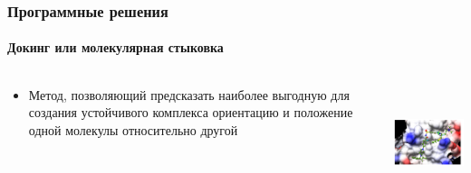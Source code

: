 \begin{frame}
  \frametitle{Программные решения}
  \framesubtitle{Докинг или молекулярная стыковка}
  \begin{columns}
    \begin{column}{0.5\textwidth}
      \begin{itemize}
        \item Метод, позволяющий предсказать наиболее выгодную для создания устойчивого комплекса ориентацию и положение
          одной молекулы относительно другой
      \end{itemize}
    \end{column}
    \begin{column}{0.5\textwidth}
  \includegraphics[height=1.3in]{images/docking.png}
\end{column}
\end{columns}
\end{frame}

